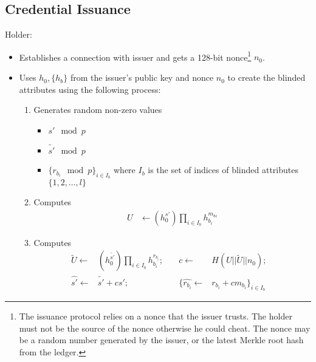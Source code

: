 \documentclass[a4paper]{article}
\begin{document}
\subsection{Credential Issuance}
Holder:
\begin{itemize}
    \item Establishes a connection with issuer and gets a 128-bit nonce\footnote{The issuance protocol relies on a nonce that the issuer trusts. The holder must not be the source of the nonce otherwise he could cheat. The nonce may be a random number generated by the issuer, or the latest Merkle root hash from the ledger.} $n_0$.
    \item Uses $h_0, \{h_b\}$ from the issuer's public key and nonce $n_0$ to create the blinded attributes using the following process:
    \begin{enumerate}
        \item Generates random non-zero values
        \begin{itemize}
            \item $s' \mod p$
            \item $\widetilde{s'} \mod p$
            \item $\{r_{b_i} \mod p\}_{i \in I_b}$ where $I_b$ is the set of indices of blinded attributes $\{1,2,\ldots,l\}$
        \end{itemize}
        \item Computes
        \begin{align}
        U&\leftarrow (h_0^{s'}) \prod_{i \in I_b}{h_{b_i}^{m_b{_i}}}
        \end{align}
        \item Computes
        \begin{align}
        \widetilde{U}\leftarrow& (h_0^{\widetilde{s'}}) \prod_{i \in I_b}{h_{b_i}^{r_{b_i}}};&\quad c\leftarrow& H(U||\widetilde{U}||n_0);&\\
        \widehat{s'}\leftarrow&\widetilde{s'} + c s';&\quad \{\widehat{r_{b_i}}\leftarrow&r_{b_i} + c m_{b_i}\}_{i \in I_b}
        \end{align}
    \end{enumerate}
\end{itemize}
\end{document}
